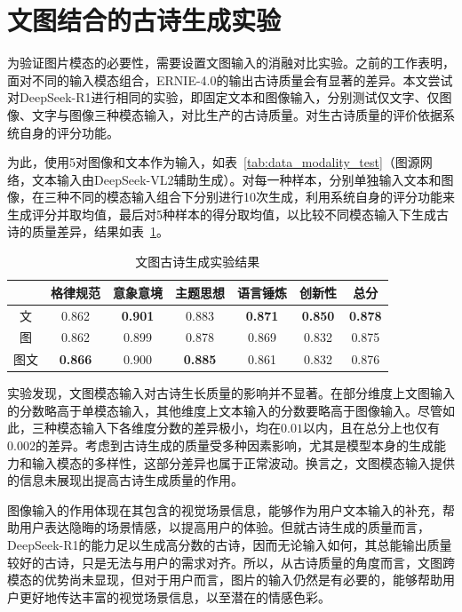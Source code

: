 

\section{文图结合的古诗生成实验}

为验证图片模态的必要性，需要设置文图输入的消融对比实验。之前的工作表明，面对不同的输入模态组合，ERNIE-4.0的输出古诗质量会有显著的差异。本文尝试对DeepSeek-R1进行相同的实验，即固定文本和图像输入，分别测试仅文字、仅图像、文字与图像三种模态输入，对比生产的古诗质量。对生古诗质量的评价依据系统自身的评分功能。

为此，使用5对图像和文本作为输入，如表~\ref{tab:data_modality_test}（图源网络，文本输入由DeepSeek-VL2辅助生成）。对每一种样本，分别单独输入文本和图像，在三种不同的模态输入组合下分别进行10次生成，利用系统自身的评分功能来生成评分并取均值，最后对5种样本的得分取均值，以比较不同模态输入下生成古诗的质量差异，结果如表~\ref{tab:test_generation_modal}。

\begin{table}[ht]
  \centering
  \caption{文图古诗生成实验结果}
  \label{tab:test_generation_modal}
  \begin{tabular}{ccccccc}
      \toprule
      & 格律规范&	意象意境&	主题思想&	语言锤炼&	创新性&	总分\\
      \midrule
      文	&	0.862 	&	\bf{0.901} 	&	0.883 	&	\bf{0.871} 	&	\bf{0.850} 	&	\bf{0.878} 	\\
      图	&	0.862 	&	0.899 	&	0.878 	&	0.869 	&	0.832 	&	0.875 	\\
      图文	&	\bf{0.866} 	&	0.900 	&	\bf{0.885} 	&	0.861 	&	0.832 	&	0.876 	\\
      \bottomrule
  \end{tabular}
\end{table}

实验发现，文图模态输入对古诗生长质量的影响并不显著。在部分维度上文图输入的分数略高于单模态输入，其他维度上文本输入的分数要略高于图像输入。尽管如此，三种模态输入下各维度分数的差异极小，均在$0.01$以内，且在总分上也仅有$0.002$的差异。考虑到古诗生成的质量受多种因素影响，尤其是模型本身的生成能力和输入模态的多样性，这部分差异也属于正常波动。换言之，文图模态输入提供的信息未展现出提高古诗生成质量的作用。

图像输入的作用体现在其包含的视觉场景信息，能够作为用户文本输入的补充，帮助用户表达隐晦的场景情感，以提高用户的体验。但就古诗生成的质量而言，DeepSeek-R1的能力足以生成高分数的古诗，因而无论输入如何，其总能输出质量较好的古诗，只是无法与用户的需求对齐。所以，从古诗质量的角度而言，文图跨模态的优势尚未显现，但对于用户而言，图片的输入仍然是有必要的，能够帮助用户更好地传达丰富的视觉场景信息，以至潜在的情感色彩。 


